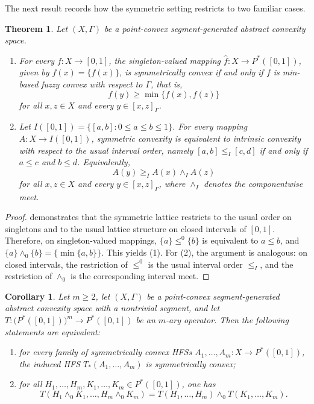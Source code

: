 \documentclass[11pt,a4paper]{article}
\newtheorem{theorem}{Theorem}
\newtheorem{corollary}{Corollary}
\begin{document}
\smallskip

The next result records how the symmetric setting restricts to two familiar cases.

\begin{theorem}\label{teo_simetrico_extension}
Let \((X,\Gamma)\) be a point-convex segment-generated abstract convexity space.
\begin{enumerate}
    \item For every \(f:X\to[0,1]\), the singleton-valued mapping \(\hat f:X\to P^*([0,1])\), given by \(\hat f(x)=\{f(x)\}\), is symmetrically convex if and only if \(f\) is min-based fuzzy convex with respect to \(\Gamma\), that is,
    \[
    f(y)\geq \min\{f(x),f(z)\}
    \]
    for all \(x,z\in X\) and every \(y\in[x,z]_{\Gamma}\).
    
    \item Let \(I([0,1])=\{[a,b]:0\le a\le b\le 1\}\). For every mapping \(A:X\to I([0,1])\), symmetric convexity is equivalent to intrinsic convexity with respect to the usual interval order, namely \([a,b]\leq_I[c,d]\) if and only if \(a\le c\) and \(b\le d\). Equivalently,
    \[
    A(y)\geq_I A(x)\wedge_I A(z)
    \]
    for all \(x,z\in X\) and every \(y\in[x,z]_{\Gamma}\), where \(\wedge_I\) denotes the componentwise meet.
\end{enumerate}
\end{theorem}

\begin{proof}
\citet{JMNS22} demonstrates that the symmetric lattice restricts to the usual order on singletons and to the usual lattice structure on closed intervals of \([0,1]\). Therefore, on singleton-valued mappings, \(\{a\}\leq^0\{b\}\) is equivalent to \(a\le b\), and \(\{a\}\wedge_0\{b\}=\{\min\{a,b\}\}\). This yields (1). For (2), the argument is analogous: on closed intervals, the restriction of \(\leq^0\) is the usual interval order \(\leq_I\), and the restriction of \(\wedge_0\) is the corresponding interval meet.
\end{proof}




\begin{corollary}\label{cor_symmetric_induced_operators}
Let \(m\geq 2\), let \((X,\Gamma)\) be a point-convex segment-generated abstract convexity space with a nontrivial segment, and let \(T:\bigl(P^*([0,1])\bigr)^m\to P^*([0,1])\) be an \(m\)-ary operator. Then the following statements are equivalent:
\begin{enumerate}
    \item for every family of symmetrically convex HFSs \(A_1,\dots,A_m:X\to P^*([0,1])\), the induced HFS \(T_*(A_1,\dots,A_m)\) is symmetrically convex;
    \item for all \(H_1,\dots,H_m,K_1,\dots,K_m\in P^*([0,1])\), one has
    \[
    T(H_1\wedge_0 K_1,\dots,H_m\wedge_0 K_m)
    =
    T(H_1,\dots,H_m)\wedge_0 T(K_1,\dots,K_m).
    \]
\end{enumerate}
\end{corollary}
\end{document}
